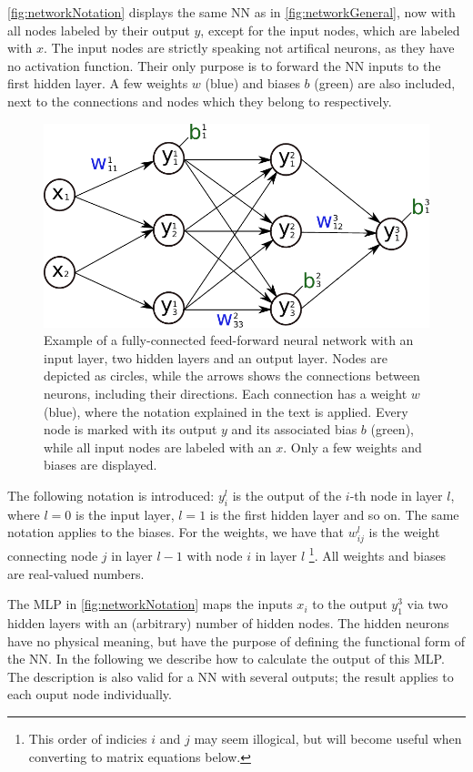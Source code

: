 \documentclass[twoside,english]{uiofysmaster}
\begin{document}
\autoref{fig:networkNotation} displays the same NN as in \autoref{fig:networkGeneral}, now with all nodes labeled by their
output $y$, except for the input nodes, which are labeled with $x$. The input nodes are strictly speaking not 
artifical neurons, as they have no activation function. Their only purpose is to forward the NN inputs to the 
first hidden layer. A few weights $w$ (blue) and biases $b$ (green) are also included, next to the connections and nodes
which they belong to respectively. 
\begin{figure}
 \centering
  \includegraphics[width=0.8\linewidth]{Figures/Theory/networkWithNotation.pdf}
  \caption{Example of a fully-connected feed-forward neural network with an input layer, two hidden layers
	   and an output layer. Nodes are depicted as circles, while the arrows shows the connections between neurons, 
	   including their directions. Each connection has a weight $w$ (blue), where the notation explained in the
	   text is applied. Every node is marked with its output $y$ and its associated bias $b$ (green), while all input nodes
	   are labeled with an $x$. Only a few weights and biases are displayed.}
  \label{fig:networkNotation}
\end{figure}
The following notation is introduced: $y_i^l$ is the output of the $i$-th node in layer $l$, where $l=0$ is the input layer, 
$l=1$ is the first hidden layer and so on. The same notation applies to the biases. For the weights, we have that
$w_{ij}^l$ is the weight connecting node $j$ in layer $l-1$ with node $i$ in layer $l$%
\footnote{This order of indicies $i$ and $j$ may seem illogical, but will become useful when converting
to matrix equations below.}.
All weights and biases are real-valued numbers.

The MLP in \autoref{fig:networkNotation} maps the inputs $x_i$ to the output $y_1^3$ via two hidden layers
with an (arbitrary) number of hidden nodes. The hidden neurons have no physical meaning, but have the purpose
of defining the functional form of the NN. In the following we describe how to calculate the output of this MLP. The description
is also valid for a NN with several outputs; the result applies to each ouput node individually. 
\end{document}

